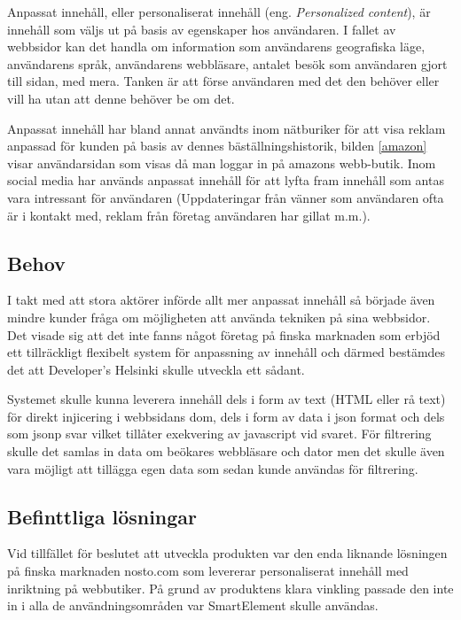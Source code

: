 Anpassat innehåll, eller personaliserat innehåll (eng. \textit{Personalized content}), är innehåll som väljs ut på basis av egenskaper hos användaren. I fallet av webbsidor kan det handla om information som användarens geografiska läge, användarens språk, användarens webbläsare, antalet besök som användaren gjort till sidan, med mera. Tanken är att förse användaren med det den behöver eller vill ha utan att denne behöver be om det. \citep{cotacm43}

Anpassat innehåll har bland annat användts inom nätburiker för att visa reklam anpassad för kunden på basis av dennes bäställningshistorik, bilden \ref{amazon} visar användarsidan som visas då man loggar in på amazons webb-butik. Inom social media har används anpassat innehåll för att lyfta fram innehåll som antas vara intressant för användaren (Uppdateringar från vänner som användaren ofta är i kontakt med, reklam från företag användaren har gillat m.m.). \citep{socialmedia}


\subsection{Behov}

I takt med att stora aktörer införde allt mer anpassat innehåll så började även mindre kunder fråga om möjligheten att använda tekniken på sina webbsidor. Det visade sig att det inte fanns något företag på finska marknaden som erbjöd ett tillräckligt flexibelt system för anpassning av innehåll och därmed bestämdes det att Developer's Helsinki skulle utveckla ett sådant.

Systemet skulle kunna leverera innehåll dels i form av text (HTML eller rå text) för direkt injicering i webbsidans \gls{dom}, dels i form av data i \gls{json} format och dels som \gls{jsonp} svar vilket tillåter exekvering av javascript vid svaret. För filtrering skulle det samlas in data om beökares webbläsare och dator men det skulle även vara möjligt att tillägga egen data som sedan kunde användas för filtrering.

\subsection{Befinttliga lösningar}

Vid tillfället för beslutet att utveckla produkten var den enda liknande lösningen på finska marknaden nosto.com som levererar personaliserat innehåll med inriktning på webbutiker.\citep{nosto} På grund av produktens klara vinkling passade den inte in i alla de användningsområden var SmartElement skulle användas.


